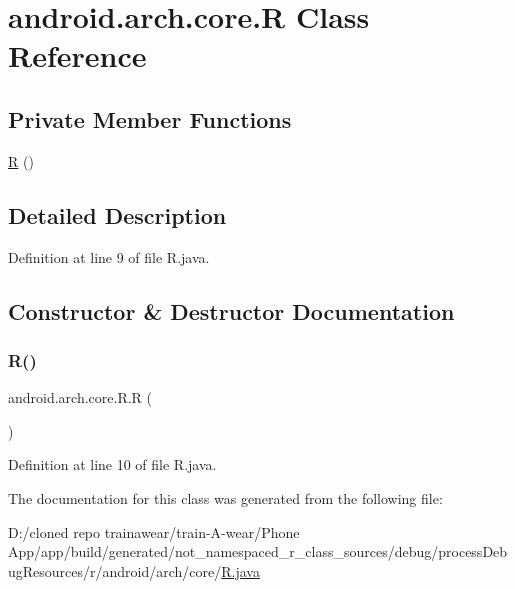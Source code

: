 \hypertarget{classandroid_1_1arch_1_1core_1_1_r}{}\section{android.\+arch.\+core.\+R Class Reference}
\label{classandroid_1_1arch_1_1core_1_1_r}
\subsection*{Private Member Functions}
\begin{DoxyCompactItemize}
\item 
\mbox{\hyperlink{classandroid_1_1arch_1_1core_1_1_r_a208fbbbf2db3d61dda377513d31cc5be}{R}} ()
\end{DoxyCompactItemize}


\subsection{Detailed Description}


Definition at line 9 of file R.\+java.



\subsection{Constructor \& Destructor Documentation}
\mbox{\label{classandroid_1_1arch_1_1core_1_1_r_a208fbbbf2db3d61dda377513d31cc5be}} 
\subsubsection{\texorpdfstring{R()}{R()}}
{\footnotesize\ttfamily android.\+arch.\+core.\+R.\+R (\begin{DoxyParamCaption}{ }\end{DoxyParamCaption})\hspace{0.3cm}{\ttfamily [private]}}



Definition at line 10 of file R.\+java.


\begin{DoxyCode}{0}

\end{DoxyCode}


The documentation for this class was generated from the following file\+:\begin{DoxyCompactItemize}
\item 
D\+:/cloned repo trainawear/train-\/\+A-\/wear/\+Phone App/app/build/generated/not\+\_\+namespaced\+\_\+r\+\_\+class\+\_\+sources/debug/process\+Debug\+Resources/r/android/arch/core/\mbox{\hyperlink{process_debug_resources_2r_2android_2arch_2core_2_r_8java}{R.\+java}}\end{DoxyCompactItemize}
